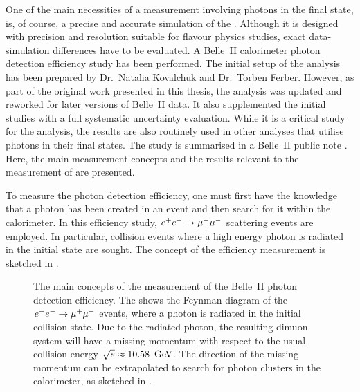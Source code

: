 One of the main necessities of a measurement involving photons in the final state, is, of course, a precise and accurate simulation of the \ECL.
Although it is designed with precision and resolution suitable for flavour physics studies, 
exact data-simulation differences have to be evaluated.
A Belle~II calorimeter photon detection efficiency study has been performed.
The initial setup of the analysis has been prepared by Dr.~Natalia Kovalchuk and Dr.~Torben Ferber. 
However, as part of the original work presented in this thesis, the analysis was updated and reworked for later versions of Belle~II data. 
It also supplemented the initial studies with a full systematic uncertainty evaluation.
While it is a critical study for the \BtoXsgamma analysis, the results are also routinely used in other analyses that utilise photons in their final states.
The study is summarised in a Belle~II public note \cite{Henrikas:2604}.
Here, the main measurement concepts and the results relevant to the measurement of \BtoXsgamma are presented.

To measure the photon detection efficiency, one must first have the knowledge that a photon has been created in an event and then search for it within the calorimeter.
In this efficiency study, $e^+e^-\rightarrow\mu^+\mu^-$ scattering events are employed.
In particular, collision events where a high energy photon is radiated in the initial state are sought.
The concept of the efficiency measurement is sketched in .
\begin{figure}[htbp!]
    \centering
    \caption{\label{fig:photon_efficiency_measurement} The main concepts of the measurement of the Belle~II photon detection efficiency.
    The  shows the Feynman diagram of the $e^+e^-\rightarrow\mu^+\mu^-$ events, where a photon is radiated in the initial collision state.
    Due to the radiated photon, the resulting dimuon system will have a missing momentum with respect to the usual collision energy $\sqrt{s}\approx10.58~\mathrm{\,Ge\kern -0.1em V}$.
    The direction of the missing momentum can be extrapolated to search for photon clusters in the calorimeter, as sketched in .
    }
\end{figure}

